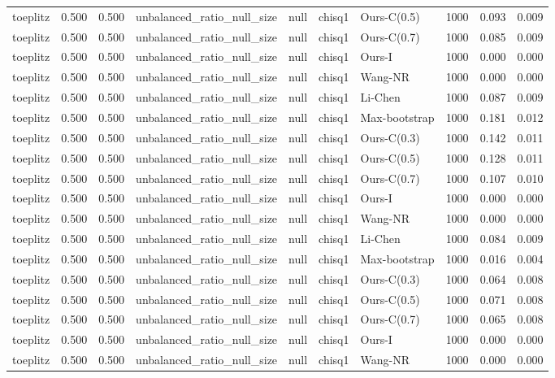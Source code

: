 \begin{tabular}{lrrllllrrr}
toeplitz & 0.500 & 0.500 & unbalanced\_ratio\_null\_size & null & chisq1 & Ours-C(0.5) & 1000 & 0.093 & 0.009 \\
toeplitz & 0.500 & 0.500 & unbalanced\_ratio\_null\_size & null & chisq1 & Ours-C(0.7) & 1000 & 0.085 & 0.009 \\
toeplitz & 0.500 & 0.500 & unbalanced\_ratio\_null\_size & null & chisq1 & Ours-I & 1000 & 0.000 & 0.000 \\
toeplitz & 0.500 & 0.500 & unbalanced\_ratio\_null\_size & null & chisq1 & Wang-NR & 1000 & 0.000 & 0.000 \\
toeplitz & 0.500 & 0.500 & unbalanced\_ratio\_null\_size & null & chisq1 & Li-Chen & 1000 & 0.087 & 0.009 \\
toeplitz & 0.500 & 0.500 & unbalanced\_ratio\_null\_size & null & chisq1 & Max-bootstrap & 1000 & 0.181 & 0.012 \\
toeplitz & 0.500 & 0.500 & unbalanced\_ratio\_null\_size & null & chisq1 & Ours-C(0.3) & 1000 & 0.142 & 0.011 \\
toeplitz & 0.500 & 0.500 & unbalanced\_ratio\_null\_size & null & chisq1 & Ours-C(0.5) & 1000 & 0.128 & 0.011 \\
toeplitz & 0.500 & 0.500 & unbalanced\_ratio\_null\_size & null & chisq1 & Ours-C(0.7) & 1000 & 0.107 & 0.010 \\
toeplitz & 0.500 & 0.500 & unbalanced\_ratio\_null\_size & null & chisq1 & Ours-I & 1000 & 0.000 & 0.000 \\
toeplitz & 0.500 & 0.500 & unbalanced\_ratio\_null\_size & null & chisq1 & Wang-NR & 1000 & 0.000 & 0.000 \\
toeplitz & 0.500 & 0.500 & unbalanced\_ratio\_null\_size & null & chisq1 & Li-Chen & 1000 & 0.084 & 0.009 \\
toeplitz & 0.500 & 0.500 & unbalanced\_ratio\_null\_size & null & chisq1 & Max-bootstrap & 1000 & 0.016 & 0.004 \\
toeplitz & 0.500 & 0.500 & unbalanced\_ratio\_null\_size & null & chisq1 & Ours-C(0.3) & 1000 & 0.064 & 0.008 \\
toeplitz & 0.500 & 0.500 & unbalanced\_ratio\_null\_size & null & chisq1 & Ours-C(0.5) & 1000 & 0.071 & 0.008 \\
toeplitz & 0.500 & 0.500 & unbalanced\_ratio\_null\_size & null & chisq1 & Ours-C(0.7) & 1000 & 0.065 & 0.008 \\
toeplitz & 0.500 & 0.500 & unbalanced\_ratio\_null\_size & null & chisq1 & Ours-I & 1000 & 0.000 & 0.000 \\
toeplitz & 0.500 & 0.500 & unbalanced\_ratio\_null\_size & null & chisq1 & Wang-NR & 1000 & 0.000 & 0.000 \\

\end{tabular}
